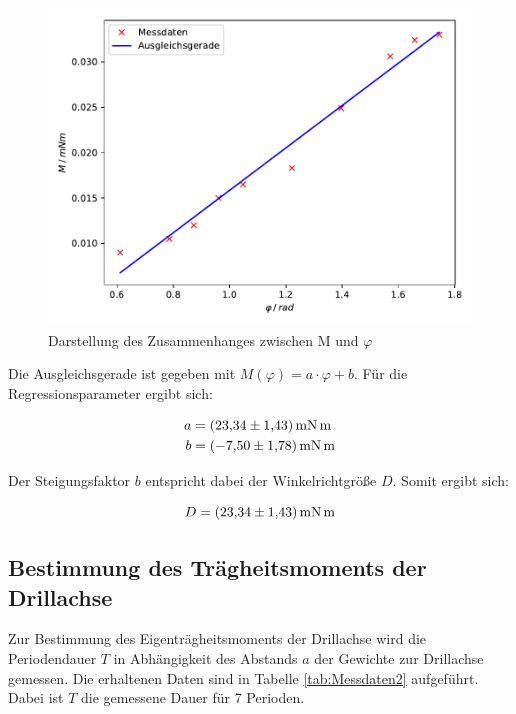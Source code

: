 \begin{figure}
  \centering
  \includegraphics[scale=0.8]{content/plot1.pdf}
  \caption{Darstellung des Zusammenhanges zwischen M und $\varphi$}
  \label{fig:plot1}
\end{figure}

Die Ausgleichsgerade ist gegeben mit $M(\varphi) = a\cdot \varphi + b$. Für die Regressionsparameter
ergibt sich: 

\begin{align*}
a &= \SI{23.34+-1.43}{\milli\newton\meter} \\
b &= \SI{-7.5+-1.78}{\milli\newton\meter}
\end{align*}

Der Steigungsfaktor $b$ entspricht dabei der Winkelrichtgröße $D$. Somit ergibt sich: 

\begin{equation*}
D = \SI{23.34+-1.43}{\milli\newton\meter}
\end{equation*}

\subsection{Bestimmung des Trägheitsmoments der Drillachse}

Zur Bestimmung des Eigenträgheitsmoments der Drillachse wird die Periodendauer $T$ in Abhängigkeit 
des Abstands $a$ der Gewichte zur Drillachse gemessen. Die erhaltenen Daten sind in Tabelle 
\ref{tab:Messdaten2} aufgeführt. Dabei ist $T$ die gemessene Dauer für 7 Perioden.

